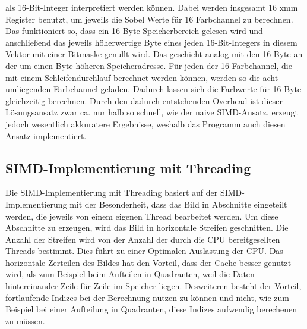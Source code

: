 \documentclass[course=erap]{aspdoc}
\begin{document}
als 16-Bit-Integer interpretiert werden können.
Dabei werden insgesamt 16 xmm Register benutzt, um jeweils die Sobel Werte für 16 Farbchannel zu berechnen.
Das funktioniert so, dass ein 16 Byte-Speicherbereich gelesen wird und anschließend das jeweils höherwertige Byte eines jeden
16-Bit-Integers in diesem Vektor mit einer Bitmaske genullt wird. Das geschieht analog mit den 16-Byte an der um einen Byte höheren Speicheradresse.
Für jeden der 16 Farbchannel, die mit einem Schleifendurchlauf berechnet werden können, werden so die acht umliegenden
Farbchannel geladen. Dadurch lassen sich die Farbwerte für 16 Byte gleichzeitig berechnen. Durch den dadurch entstehenden Overhead
ist dieser Lösungsansatz zwar ca. nur halb so schnell, wie der naive SIMD-Ansatz, erzeugt jedoch wesentlich
akkuratere Ergebnisse, weshalb das Programm auch diesen Ansatz implementiert.

\subsection{SIMD-Implementierung mit Threading}
\label{sec:simd-threading}
Die SIMD-Implementierung mit Threading basiert auf der SIMD-Implementierung mit der Besonderheit, dass das Bild in Abschnitte eingeteilt werden, die jeweils von einem eigenen Thread bearbeitet werden.
Um diese Abschnitte zu erzeugen, wird das Bild in horizontale Streifen geschnitten. Die Anzahl der Streifen wird von der Anzahl der durch die CPU bereitgesellten Threads bestimmt. Dies führt zu einer Optimalen Auslastung der CPU.
Das horizontale Zerteilen des Bildes hat den Vorteil, dass der Cache besser genutzt wird, als zum Beispiel beim Aufteilen in Quadranten, weil die Daten hintereinander Zeile für Zeile im Speicher liegen.
Desweiteren besteht der Vorteil, fortlaufende Indizes bei der Berechnung nutzen zu können und nicht, wie zum Beispiel bei einer Aufteilung in Quadranten, diese Indizes aufwendig berechenen zu müssen.
\end{document}
